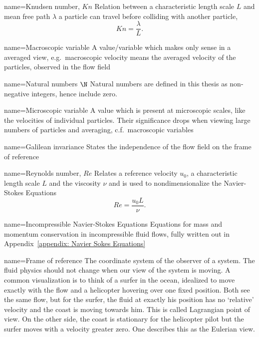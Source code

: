 
{
name={Knudsen number, $Kn$}
}
{Relation between a characteristic length scale $L$ and mean free path $\lambda$ a particle can travel before colliding with another particle,
\begin{equation}
  Kn=\frac{\lambda}{L}.
\end{equation}}

{
name={Macroscopic variable}
}
{A value/variable which makes only sense in a averaged view, e.g.\ macroscopic velocity means the averaged velocity of the particles, observed in the flow field
}

{
name={Natural numbers $\N$}
}
{Natural numbers are defined in this thesis as non-negative integers, hence include zero.
}

{
name={Microscopic variable}
}
{
A value which is present at microscopic scales, like the velocities of individual particles.
Their significance drops when viewing large numbers of particles and averaging, c.f.\ macroscopic variables
}

{
name={Galilean invariance}
}{States the independence of the flow field on the frame of reference}

{
name={Reynolds number, $Re$}
}
{Relates a reference velocity $u_0$, a characteristic length scale $L$ and the viscosity $\nu$ and is used to nondimensionalize the Navier-Stokes Equations
\begin{equation}
  \label{eq: definition of reynolds number}
  Re=\frac{u_0 L}{\nu}.
\end{equation}}

{
name={Incompressible Navier-Stokes Equations}
}
{Equations for mass and momentum conservation in incompressible fluid flows, fully written out in Appendix~\ref{appendix: Navier Sokes Equations}
}

{
name={Frame of reference}
}
{
The coordinate system of the observer of a system.
The fluid physics should not change when our view of the system is moving.
A common visualization is to think of a surfer in the ocean, idealized to move exactly with the flow and a helicopter hovering over one fixed position.
Both see the same flow, but for the surfer, the fluid at exactly his position has no `relative' velocity and the coast is moving towards him. This is called Lagrangian point of view.
On the other side, the coast is stationary for the helicopter pilot but the surfer moves with a velocity greater zero. One describes this as the Eulerian view.
}
